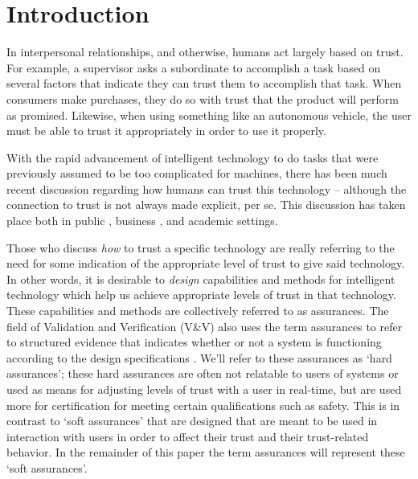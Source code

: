 \section{Introduction}
    In interpersonal relationships, and otherwise, humans act largely based on trust. For example, a supervisor asks a subordinate to accomplish a task based on several factors that indicate they can trust them to accomplish that task. When consumers make purchases, they do so with trust that the product will perform as promised. Likewise, when using something like an autonomous vehicle, the user must be able to trust it appropriately in order to use it properly.

    With the rapid advancement of intelligent technology to do tasks that were previously assumed to be too complicated for machines, there has been much recent discussion regarding how humans can trust this technology -- although the connection to trust is not always made explicit, per se. This discussion has taken place both in public \cite{Spectrum2016-jv,DeSteno2014-cq,Cranz2017-yh,Cassel2017-tn,Danks2017-sb,Wagner2016-ck}, business \cite{Banavar2016-nm, Khosravi2016-ke,Moody2017-vd,Rudnitsky2017-in,Benioff2016-tc,Tankard2016-rk}, and academic \cite{Groom2007-bz,Lloyd2014-bb,Goodrum_2016-fm,Foley2017-qj,Ghahramani2015-yq,Castelvecchi2016-mr} settings.

    Those who discuss \emph{how} to trust a specific technology are really referring to the need for some indication of the appropriate level of trust to give said technology. In other words, it is desirable to \emph{design} capabilities and methods for intelligent technology which help us achieve appropriate levels of trust in that technology. These capabilities and methods are collectively referred to as assurances. The field of Validation and Verification (V\&V) also uses the term assurances to refer to structured evidence that indicates whether or not a system is functioning according to the design specifications \cite{Calinescu2017-fh}. We'll refer to these assurances as `hard assurances'; these hard assurances are often not relatable to users of systems or used as means for adjusting levels of trust with a user in real-time, but are used more for certification for meeting certain qualifications such as safety. This is in contrast to `soft assurances' that are designed that are meant to be used in interaction with users in order to affect their trust and their trust-related behavior. In the remainder of this paper the term assurances will represent these `soft assurances'.
    
